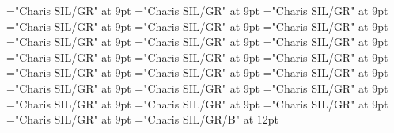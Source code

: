 \documentclass[gps1,twoside]{article}
\begin{document}
\font\academicdomainacademicdomainacademicdomainssensesensessensesensesentrybefore="Charis SIL/GR" at 9pt
\font\academicdomainssensesensessensesensesentrybefore="Charis SIL/GR" at 9pt
\font\academicdomainssensesensessensesensesentryafter="Charis SIL/GR" at 9pt
\font\spanspanabbreviationacademicdomainacademicdomainssensesensessensesensesentrybefore="Charis SIL/GR" at 9pt
\font\spanspannameacademicdomainacademicdomainssensesensessensesensesentrybefore="Charis SIL/GR" at 9pt
\font\spannameacademicdomainacademicdomainssensesensessensesensesentryfirstchildbefore="Charis SIL/GR" at 9pt
\font\spannameacademicdomainacademicdomainssensesensessensesensesentrylastchildafter="Charis SIL/GR" at 9pt
\font\usageusageusagessensesensessensesensesentrybefore="Charis SIL/GR" at 9pt
\font\usagessensesensessensesensesentrybefore="Charis SIL/GR" at 9pt
\font\usagessensesensessensesensesentryafter="Charis SIL/GR" at 9pt
\font\spanspanabbreviationusageusagessensesensessensesensesentrybefore="Charis SIL/GR" at 9pt
\font\complexformsnotsubentrycomplexformsnotsubentrycomplexformsnotsubentriessensesensessensesensesentrybefore="Charis SIL/GR" at 9pt
\font\complexformsnotsubentriessensesensessensesensesentryafter="Charis SIL/GR" at 9pt
\font\complexformtypescomplexformsnotsubentrycomplexformsnotsubentriessensesensessensesensesentryafter="Charis SIL/GR" at 9pt
\font\spanspanreverseabbrcomplexformtypecomplexformtypescomplexformsnotsubentrycomplexformsnotsubentriessensesensessensesensesentrybefore="Charis SIL/GR" at 9pt
\font\spanspanheadwordcomplexformsnotsubentrycomplexformsnotsubentriessensesensessensesensesentrybefore="Charis SIL/GR" at 9pt
\font\spanspanowningentrysummarydefinitioncomplexformsnotsubentrycomplexformsnotsubentriessensesensessensesensesentrybefore="Charis SIL/GR" at 9pt
\font\spanowningentrysummarydefinitioncomplexformsnotsubentrycomplexformsnotsubentriessensesensessensesensesentryfirstchildbefore="Charis SIL/GR" at 9pt
\font\spanowningentrysummarydefinitioncomplexformsnotsubentrycomplexformsnotsubentriessensesensessensesensesentrylastchildafter="Charis SIL/GR" at 9pt
\font\nontrivialentryrootnontrivialentryrootnontrivialentryrootscomplexformsnotsubentrycomplexformsnotsubentriessensesensessensesensesentrybefore="Charis SIL/GR" at 9pt
\font\nontrivialentryrootscomplexformsnotsubentrycomplexformsnotsubentriessensesensessensesensesentrybefore="Charis SIL/GR" at 9pt
\font\nontrivialentryrootscomplexformsnotsubentrycomplexformsnotsubentriessensesensessensesensesentryafter="Charis SIL/GR" at 9pt
\font\nontrivialentryrootnontrivialentryrootscomplexformsnotsubentrycomplexformsnotsubentriessensesensessensesensesentry="Charis SIL/GR/B" at 12pt
\end{document}
